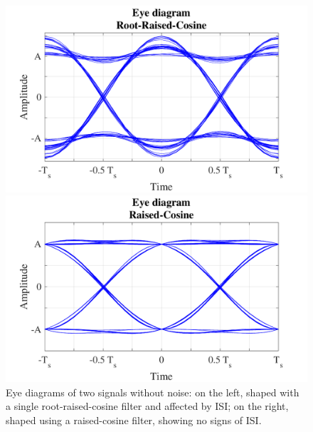 	\begin{figure}
		\centering
		\begin{minipage}{0.45\textwidth}
			\includegraphics[width=\textwidth]{./sdf/m_qam_system/figures/eyes/ISI/RRC.pdf}
		\end{minipage}
		\begin{minipage}{0.45\textwidth}
			\includegraphics[width=\textwidth]{./sdf/m_qam_system/figures/eyes/ISI/RC.pdf}
		\end{minipage}
		\caption{Eye diagrams of two signals without noise: on the left,
			shaped with a single root-raised-cosine filter and affected by ISI; on the right,
		shaped using a raised-cosine filter, showing no signs of ISI.}
		\label{fig:ISIcomp}
	\end{figure}




